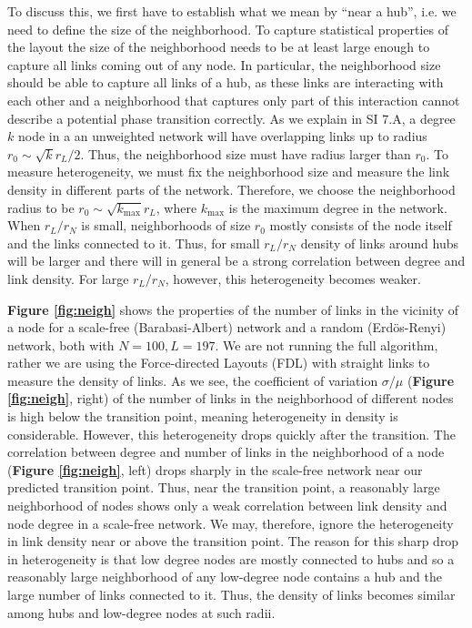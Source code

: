\documentclass[linenumbers,endfloats,nofootinbib,preprint,floatfix,titlepage,superscriptaddress]{revtex4-1} %
\begin{document}
{%
To discuss this, we first have to establish what we mean by ``near a hub'', i.e. we need to define the size of the neighborhood.
To capture statistical properties of the layout the size of the neighborhood needs to be at least large enough to capture all links coming out of any node. 
In particular, the neighborhood size should be able to capture all links of a hub, as these links are interacting with each other and a neighborhood that captures only part of this interaction cannot describe a potential phase transition correctly. 
As we explain in SI 7.A, a degree $k$ node in a an unweighted network will have overlapping links up to radius $r_0\sim \sqrt{k} r_L/2 $. 
Thus, the neighborhood size must have radius larger than $r_0$. 
To measure heterogeneity, we must fix the neighborhood size and measure the link density in different parts of the network. 
Therefore, we choose the neighborhood radius to be $r_0\sim \sqrt{k_{\max}} r_L  $, where $k_{\max}$ is the maximum degree in the network. 
When $r_L/r_N$ is small, neighborhoods of size $r_0$ mostly consists of the node itself and the links connected to it. 
Thus, for small $r_L/r_N$ density of links around hubs will be larger and there will in general be a strong correlation between degree and link density. 
For large $r_L/r_N$, however, this heterogeneity becomes weaker. 

\textbf{Figure \ref{fig:neigh}} shows the properties of the number of links in the vicinity of a node for a scale-free (Barabasi-Albert) network and a random (Erd\"os-Renyi) network, both with $N=100, L=197$. 
We are not running the full algorithm, rather we are using the Force-directed Layouts (FDL) with straight links to measure the density of links. 
As we see, the coefficient of variation $\sigma/\mu$ (\textbf{Figure \ref{fig:neigh}}, right) of the number of links in the neighborhood of different nodes is high below the transition point, meaning heterogeneity in density is considerable. 
However, this heterogeneity  drops quickly after the transition.  
The correlation between degree and number of links in the neighborhood of a node (\textbf{Figure \ref{fig:neigh}}, left) drops sharply in the scale-free  network near our predicted transition point. 
Thus, near the transition point, a reasonably large neighborhood of nodes shows only a weak correlation between link density and node degree in a scale-free network.
We may, therefore, ignore the heterogeneity in link density near or above the transition point. 
The reason for this sharp drop in heterogeneity is that low degree nodes are mostly connected to hubs and so a reasonably large neighborhood of any low-degree node contains a hub and the large number of links connected to it. Thus, the density of links becomes similar among hubs and low-degree nodes at such radii.  

}
\end{document}
